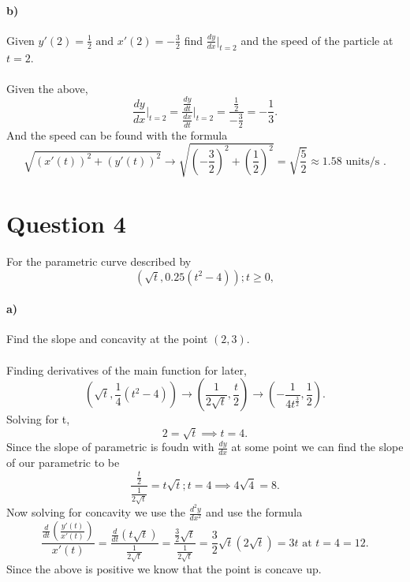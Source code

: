 \documentclass{report}
\begin{document}
\paragraph{b)} Given $ y'\left( 2 \right) =\frac{ 1 }{ 2 } \text{ and } x'\left( 2 \right) =-\frac{ 3 }{ 2 } $ find $ \frac{ dy }{ dx } \bigg|_{ t=2 } $ and the speed of the particle at $ t=2 $.\\ \\
Given the above,
\[
\frac{ dy }{ dx } \bigg|_{ t=2 } = \frac{ \frac{ dy }{ dt }  }{ \frac{ dx }{ dt }  } \bigg|_{ t=2 } = \frac{ \frac{ 1 }{ 2 }  }{ -\frac{ 3 }{ 2 }  } = -\frac{ 1 }{ 3 }
.\] 
And the speed can be found with the formula 
\[
\sqrt{ \left( x'\left( t \right)  \right) ^2+ \left( y'\left( t \right)  \right) ^2 } \to \sqrt{ \left( -\frac{ 3 }{ 2 }  \right) ^2+\left( \frac{ 1 }{ 2 }  \right) ^2 } =\sqrt{ \frac{ 5 }{ 2 }  } \approx 1.58 \text{ units/s }
.\] 

\section*{Question 4}%
\label{sec:Question 4}
For the parametric curve described by 
\[
	\left( \sqrt{ t } ,0.25\left( t^2-4 \right)  \right) ;t\ge 0,
\] 
\paragraph{a)} Find the slope and concavity at the point $ \left( 2,3 \right)   $.\\ \\
Finding derivatives of the main function for later,
\[
	\left( \sqrt{ t } ,\frac{ 1 }{ 4 } \left( t^2-4 \right)  \right) \to \left( \frac{ 1 }{ 2\sqrt{ t }  } ,\frac{ t }{ 2 }  \right) \to \left( -\frac{ 1 }{ 4t^{ \frac{ 3 }{ 2 }  } }, \frac{ 1 }{ 2 }   \right) 
.\] 
Solving for t,
\[
2=\sqrt{ t } \implies t=4
.\] 
Since the slope of parametric is foudn with $ \frac{ dy }{ dx }  $ at some point  we can find the slope of our parametric to be
\[
\frac{ \frac{ t }{ 2 }  }{ \frac{ 1 }{ 2\sqrt{ t }  }  }=t\sqrt{ t };t=4 \implies 4\sqrt{ 4 } =8
.\] 
Now solving for concavity we use the $ \frac{ d^2y }{ dx^2 } $ and use the formula 
\[
\frac{ \frac{ d }{ dt } \left( \frac{ y'\left( t \right)  }{ x'\left( t \right)  } \right)  }{ x'\left( t \right)  }= \frac{ \frac{ d }{ dt } \left( t\sqrt{ t }  \right)  }{ \frac{ 1 }{ 2\sqrt{ t }  }   } = \frac{ \frac{ 3 }{ 2 } \sqrt{ t }  }{ \frac{ 1 }{ 2\sqrt{ t }  }  } = \frac{ 3 }{ 2 } \sqrt{ t } \left( 2\sqrt{ t } \right) =3t \text{ at }t=4 = 12
.\] 
Since the above is positive we know that the point is concave up.
\end{document}
